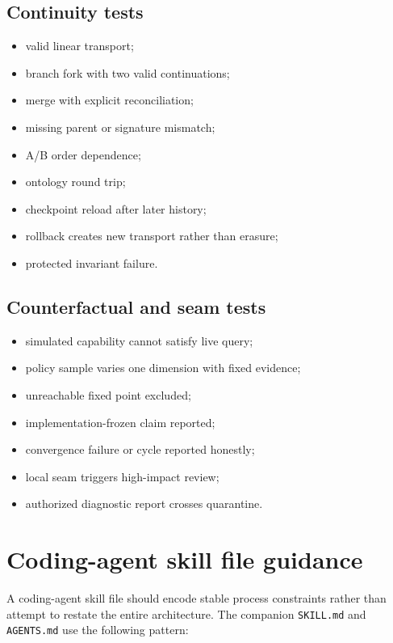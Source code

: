 \documentclass[11pt,oneside]{report}
\begin{document}
\section{Continuity tests}

\begin{itemize}
  \item valid linear transport;
  \item branch fork with two valid continuations;
  \item merge with explicit reconciliation;
  \item missing parent or signature mismatch;
  \item A/B order dependence;
  \item ontology round trip;
  \item checkpoint reload after later history;
  \item rollback creates new transport rather than erasure;
  \item protected invariant failure.
\end{itemize}

\section{Counterfactual and seam tests}

\begin{itemize}
  \item simulated capability cannot satisfy live query;
  \item policy sample varies one dimension with fixed evidence;
  \item unreachable fixed point excluded;
  \item implementation-frozen claim reported;
  \item convergence failure or cycle reported honestly;
  \item local seam triggers high-impact review;
  \item authorized diagnostic report crosses quarantine.
\end{itemize}

\chapter{Coding-agent skill file guidance}

A coding-agent skill file should encode stable process constraints rather than attempt to restate the entire architecture. The companion \texttt{SKILL.md} and \texttt{AGENTS.md} use the following pattern:
\end{document}
